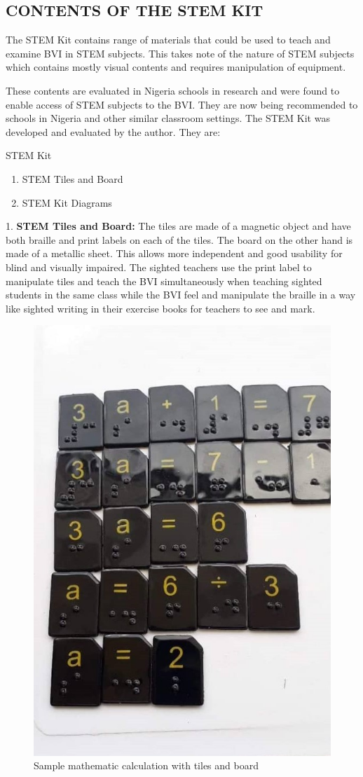 \documentclass[11.5pt]{sig-alternate} %
\begin{document}
\begin{large}
\section*{CONTENTS OF THE STEM KIT\textcopyright{}}
The STEM Kit\textcopyright{} contains range of materials that could be used to teach and examine BVI in STEM subjects. This takes note of the nature of STEM subjects which contains mostly visual contents and requires manipulation of equipment. 

These contents are evaluated in Nigeria schools in research and were found to enable access of STEM subjects to the BVI. They are now being recommended to schools in Nigeria and other similar classroom settings. The STEM Kit\textcopyright{}{} was developed and evaluated by the author. They are:

STEM Kit\textcopyright{}
\begin{enumerate}
    \item STEM Tiles and Board
    \item STEM Kit Diagrams
\end{enumerate}

1. \textbf{STEM Tiles and Board: }The tiles are made of a magnetic object and have both braille and print labels on each of the tiles. The board on the other hand is made of a metallic sheet. This allows more independent and good usability for blind and visually impaired. The sighted teachers use the print label to manipulate tiles and teach the BVI simultaneously when teaching sighted students in the same class while the BVI feel and manipulate the braille in a way like sighted writing in their exercise books for teachers to see and mark. 

\begin{figure}[!h]
    \centering
    \includegraphics[width=0.55\linewidth]{images/fig1.jpg}
    \caption{Sample mathematic calculation with tiles and board}
\end{figure}


\end{large}
\end{document}
